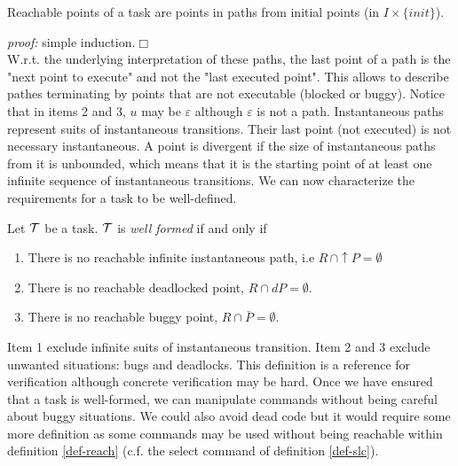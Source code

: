 \documentclass{article}
\begin{document}
\begin{fact}\label{fact-rchpth} Reachable points of a task are points in paths from initial points (in $I\times\{init\}$).
\end{fact}
{\em proof:} simple induction.$\Box$\\
W.r.t. the underlying interpretation of these paths, the last point of a path is the "next point to execute" and not the "last executed point". This  allows to describe pathes terminating by points that are not executable (blocked or buggy). Notice that in items 2 and 3, $u$ may be $\varepsilon$ although $\varepsilon$ is not a path. Instantaneous paths represent suits of instantaneous transitions. Their last point (not executed) is not necessary instantaneous. A point is divergent if the size of instantaneous paths from it is unbounded, which means that it is the starting point of at least one infinite sequence of instantaneous transitions. We can now characterize the requirements for a task to be well-defined.

\begin{definition}\label{def-wd} Let ${\cal T}$ be a task.
${\cal T}$ is {\em well formed} if and only if
\begin{enumerate}
\item There is no reachable infinite instantaneous path, i.e $R\,\cap\uparrow\!P=\emptyset$
\item There is no reachable deadlocked point, $R\cap dP=\emptyset$.
\item There is no reachable buggy point, $R\cap \bar P=\emptyset$.
\end{enumerate}
\end{definition}
Item 1 exclude infinite suits of instantaneous transition. Item 2 and 3 exclude unwanted situations: bugs and deadlocks. This definition is a reference for verification although concrete verification may be hard. Once we have ensured that a task is well-formed, we can manipulate commands without being careful about buggy situations. We could also avoid dead code but it would require some more definition as some commands may be used without being reachable within definition \ref{def-reach} (c.f. the select command of definition \ref{def-slc}).
\end{document}
